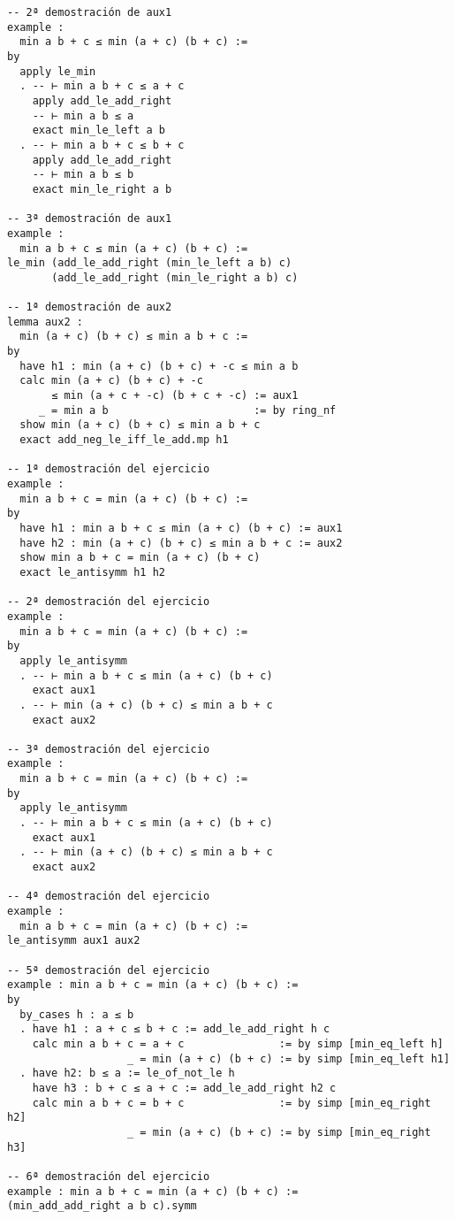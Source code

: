 \begin{verbatim}
-- 2ª demostración de aux1
example :
  min a b + c ≤ min (a + c) (b + c) :=
by
  apply le_min
  . -- ⊢ min a b + c ≤ a + c
    apply add_le_add_right
    -- ⊢ min a b ≤ a
    exact min_le_left a b
  . -- ⊢ min a b + c ≤ b + c
    apply add_le_add_right
    -- ⊢ min a b ≤ b
    exact min_le_right a b

-- 3ª demostración de aux1
example :
  min a b + c ≤ min (a + c) (b + c) :=
le_min (add_le_add_right (min_le_left a b) c)
       (add_le_add_right (min_le_right a b) c)

-- 1ª demostración de aux2
lemma aux2 :
  min (a + c) (b + c) ≤ min a b + c :=
by
  have h1 : min (a + c) (b + c) + -c ≤ min a b
  calc min (a + c) (b + c) + -c
       ≤ min (a + c + -c) (b + c + -c) := aux1
     _ = min a b                       := by ring_nf
  show min (a + c) (b + c) ≤ min a b + c
  exact add_neg_le_iff_le_add.mp h1

-- 1ª demostración del ejercicio
example :
  min a b + c = min (a + c) (b + c) :=
by
  have h1 : min a b + c ≤ min (a + c) (b + c) := aux1
  have h2 : min (a + c) (b + c) ≤ min a b + c := aux2
  show min a b + c = min (a + c) (b + c)
  exact le_antisymm h1 h2

-- 2ª demostración del ejercicio
example :
  min a b + c = min (a + c) (b + c) :=
by
  apply le_antisymm
  . -- ⊢ min a b + c ≤ min (a + c) (b + c)
    exact aux1
  . -- ⊢ min (a + c) (b + c) ≤ min a b + c
    exact aux2

-- 3ª demostración del ejercicio
example :
  min a b + c = min (a + c) (b + c) :=
by
  apply le_antisymm
  . -- ⊢ min a b + c ≤ min (a + c) (b + c)
    exact aux1
  . -- ⊢ min (a + c) (b + c) ≤ min a b + c
    exact aux2

-- 4ª demostración del ejercicio
example :
  min a b + c = min (a + c) (b + c) :=
le_antisymm aux1 aux2

-- 5ª demostración del ejercicio
example : min a b + c = min (a + c) (b + c) :=
by
  by_cases h : a ≤ b
  . have h1 : a + c ≤ b + c := add_le_add_right h c
    calc min a b + c = a + c               := by simp [min_eq_left h]
                   _ = min (a + c) (b + c) := by simp [min_eq_left h1]
  . have h2: b ≤ a := le_of_not_le h
    have h3 : b + c ≤ a + c := add_le_add_right h2 c
    calc min a b + c = b + c               := by simp [min_eq_right h2]
                   _ = min (a + c) (b + c) := by simp [min_eq_right h3]

-- 6ª demostración del ejercicio
example : min a b + c = min (a + c) (b + c) :=
(min_add_add_right a b c).symm
\end{verbatim}

